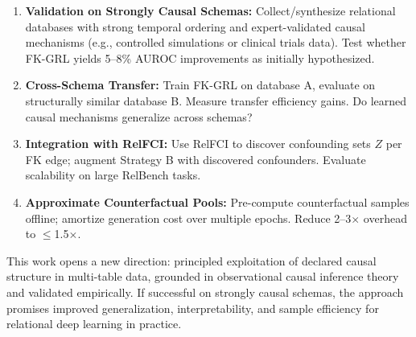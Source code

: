 \documentclass[11pt,letterpaper]{article}
\begin{document}
\begin{enumerate}
\item \textbf{Validation on Strongly Causal Schemas:} Collect/synthesize relational databases with strong temporal ordering and expert-validated causal mechanisms (e.g., controlled simulations or clinical trials data). Test whether FK-GRL yields 5--8\% AUROC improvements as initially hypothesized.

\item \textbf{Cross-Schema Transfer:} Train FK-GRL on database A, evaluate on structurally similar database B. Measure transfer efficiency gains. Do learned causal mechanisms generalize across schemas?

\item \textbf{Integration with RelFCI:} Use RelFCI to discover confounding sets $Z$ per FK edge; augment Strategy B with discovered confounders. Evaluate scalability on large RelBench tasks.

\item \textbf{Approximate Counterfactual Pools:} Pre-compute counterfactual samples offline; amortize generation cost over multiple epochs. Reduce 2--3$\times$ overhead to $\leq$1.5$\times$.
\end{enumerate}

This work opens a new direction: principled exploitation of declared causal structure in multi-table data, grounded in observational causal inference theory and validated empirically. If successful on strongly causal schemas, the approach promises improved generalization, interpretability, and sample efficiency for relational deep learning in practice.



\end{document}
